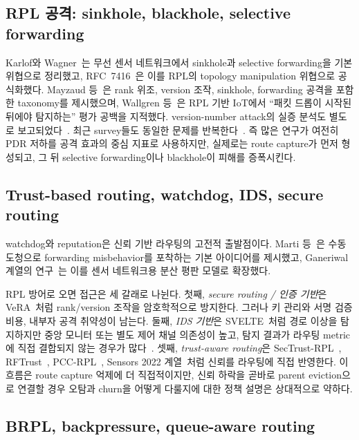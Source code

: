 \documentclass[10pt,a4paper,twocolumn]{article}
\begin{document}
\subsection{RPL 공격: sinkhole, blackhole, selective forwarding}

Karlof와 Wagner~\cite{karlof2003}는 무선 센서 네트워크에서
sinkhole과 selective forwarding을 기본 위협으로 정리했고,
RFC~7416~\cite{rfc7416}은 이를 RPL의 topology manipulation 위협으로 공식화했다.
Mayzaud 등~\cite{mayzaud2016}은 rank 위조, version 조작, sinkhole,
forwarding 공격을 포함한 taxonomy를 제시했으며,
Wallgren 등~\cite{secrpl}은 RPL 기반 IoT에서
``패킷 드롭이 시작된 뒤에야 탐지하는'' 평가 공백을 지적했다.
version-number attack의 실증 분석도 별도로 보고되었다~\cite{aris2016}.
최근 survey들도 동일한 문제를 반복한다~\cite{sinkhole_survey2023,rpl_survey2025,raoof2019}.
즉 많은 연구가 여전히 PDR 저하를 공격 효과의 중심 지표로 사용하지만,
실제로는 route capture가 먼저 형성되고,
그 뒤 selective forwarding이나 blackhole이 피해를 증폭시킨다.

\subsection{Trust-based routing, watchdog, IDS, secure routing}

watchdog와 reputation은 신뢰 기반 라우팅의 고전적 출발점이다.
Marti 등~\cite{marti2000}은 수동 도청으로 forwarding misbehavior를 포착하는
기본 아이디어를 제시했고,
Ganeriwal 계열의 연구~\cite{airtime_trust,rfsn2008}는 이를
센서 네트워크용 분산 평판 모델로 확장했다.

RPL 방어로 오면 접근은 세 갈래로 나뉜다.
첫째, \emph{secure routing / 인증 기반}은
VeRA~\cite{dvir2011}처럼 rank/version 조작을 암호학적으로 방지한다.
그러나 키 관리와 서명 검증 비용, 내부자 공격 취약성이 남는다.
둘째, \emph{IDS 기반}은 SVELTE~\cite{raza2013}처럼
경로 이상을 탐지하지만 중앙 모니터 또는 별도 제어 채널 의존성이 높고,
탐지 결과가 라우팅 metric에 직접 결합되지 않는 경우가 많다~\cite{iotroute_survey2016}.
셋째, \emph{trust-aware routing}은
SecTrust-RPL~\cite{sectrust2019}, RFTrust~\cite{rftrust2021},
PCC-RPL~\cite{pccrpl2022}, Sensors 2022 계열~\cite{trustmodel2022,trustids2022}처럼
신뢰를 라우팅에 직접 반영한다.
이 흐름은 route capture 억제에 더 직접적이지만,
신뢰 하락을 곧바로 parent eviction으로 연결할 경우
오탐과 churn을 어떻게 다룰지에 대한 정책 설명은 상대적으로 약하다.

\subsection{BRPL, backpressure, queue-aware routing}
\end{document}
